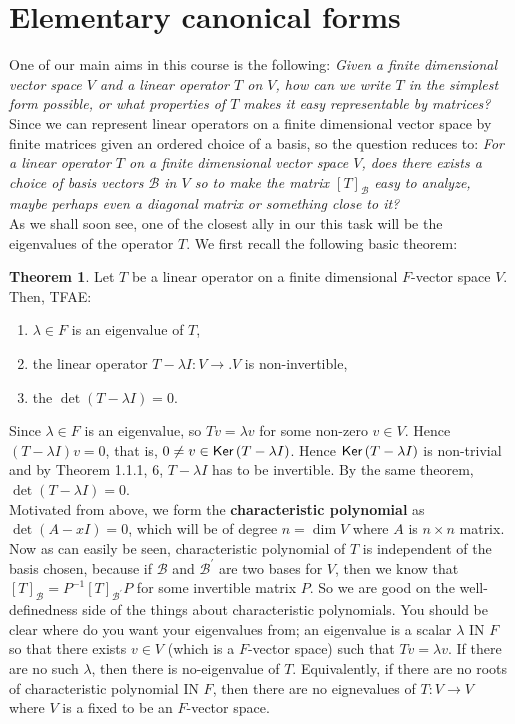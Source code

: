 \documentclass[letterpaper,11pt,twoside]{article}
\theoremstyle{definition}
\theoremstyle{definition}
\newtheorem{theorem}[proposition]{Theorem}
\theoremstyle{definition}
\theoremstyle{definition}
\theoremstyle{definition}
\theoremstyle{definition}
\theoremstyle{remark}
\theoremstyle{definition}
\newcommand{\Ker}[1]{{\fontfamily{lmss}\selectfont 
		\text{Ker}\left (#1\right )
}}
\begin{document}
    \section{Elementary canonical forms}
    One of our main aims in this course is the following: \textit{Given a finite dimensional vector space $V$ and a linear operator $T$ on $V$, how can we write $T$ in the simplest form possible, or what properties of $T$ makes it easy representable by matrices?} Since we can represent linear operators on a finite dimensional vector space by finite matrices given an ordered choice of a basis, so the question reduces to: \textit{For a linear operator $T$ on a finite dimensional vector space $V$, does there exists a choice of basis vectors $\mathcal{B}$ in $V$ so to make the matrix $[T]_{\mathcal{B}}$ easy to analyze, maybe perhaps even a diagonal matrix or something close to it?}\\
    
    As we shall soon see, one of the closest ally in our this task will be the eigenvalues of the operator $T$. We first recall the following basic theorem:
    \begin{theorem}
    Let $T$ be a linear operator on a finite dimensional $F$-vector space $V$. Then, TFAE:
    \begin{enumerate}
        \item {$\lambda \in F$ is an eigenvalue of $T$,}
        \item {the linear operator $T-\lambda I : V\to. V$ is non-invertible,}
        \item {the $\det (T-\lambda I ) = 0$.}
    \end{enumerate}
    \end{theorem}
    Since $\lambda \in F$ is an eigenvalue, so $Tv = \lambda v$ for some non-zero $v \in V$. Hence $(T-\lambda I) v =0$, that is, $0\neq v \in \Ker {T-\lambda I}$. Hence $\Ker{T-\lambda I}$ is non-trivial and by Theorem 1.1.1, 6, $T-\lambda I$ has to be invertible. By the same theorem, $\det (T-\lambda I) = 0$. \\
    Motivated from above, we form the \textbf{characteristic polynomial} as $\det (A-xI) = 0$, which will be of degree $n = \dim V$ where $A$ is $n\times n$ matrix. Now as can easily be seen, characteristic polynomial of $T$ is independent of the basis chosen, because if $\mathcal{B}$ and $\mathcal{B}^\prime$ are two bases for $V$, then we know that $[T]_\mathcal{B} = P^{-1}[T]_{\mathcal{B}^\prime} P$ for some invertible matrix $P$. So we are good on the well-definedness side of the things about characteristic polynomials. You should be clear where do you want your eigenvalues from; an eigenvalue is a scalar $\lambda $ IN $F$ so that there exists $v\in V$ (which is a $F$-vector space) such that $Tv = \lambda v$. If there are no such $\lambda$, then there is no-eigenvalue of $T$. Equivalently, if there are no roots of characteristic polynomial IN $F$, then there are no eignevalues of $T : V\to V$ where $V$ is a fixed to be an $F$-vector space.\\
    
\end{document}
